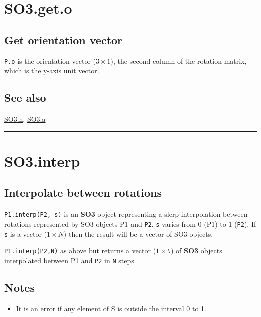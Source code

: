 \hypertarget{SO3.get.o}{\section*{SO3.get.o}}
\subsection*{Get orientation vector}


\texttt{P.o} is the orientation vector ($3 \times 1$), the second column of the rotation matrix,
which is the y-axis unit vector..


\subsection*{See also}


\hyperlink{SO3.n}{\color{blue} SO3.n}, \hyperlink{SO3.a}{\color{blue} SO3.a}

\vspace{1.5ex}\hrule

\hypertarget{SO3.interp}{\section*{SO3.interp}}
\subsection*{Interpolate between rotations}


\texttt{P1.interp(P2, s)} is an \textbf{\color{red} SO3} object representing a slerp interpolation
between rotations represented by SO3 objects P1 and \texttt{P2}.  \texttt{s} varies from 0
(P1) to 1 (\texttt{P2}).  If \texttt{s} is a vector ($1 \times N$) then the result will be a vector
of SO3 objects.



\texttt{P1.interp(P2,N)} as above but returns a vector ($1 \times \texttt{N}$) of \textbf{\color{red} SO3} objects
interpolated between P1 and \texttt{P2} in \texttt{N} steps.


\subsection*{Notes}
\begin{itemize}
  \item It is an error if any element of S is outside the interval 0 to 1.
\end{itemize}

